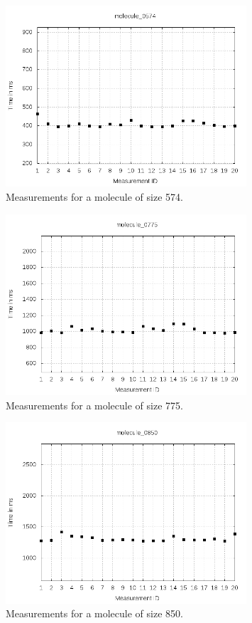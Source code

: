 \documentclass[a4paper,12pt]{article}
\begin{document}
\begin{figure}[!h]
  \centering
    \includegraphics[width=0.8\textwidth]{images/solver-perf-molecule_0574.png}
  \caption{Measurements for a molecule of size 574.}
\end{figure}

\begin{figure}[!h]
  \centering
    \includegraphics[width=0.8\textwidth]{images/solver-perf-molecule_0775.png}
  \caption{Measurements for a molecule of size 775.}
\end{figure}

\begin{figure}[!h]
  \centering
    \includegraphics[width=0.8\textwidth]{images/solver-perf-molecule_0850.png}
  \caption{Measurements for a molecule of size 850.}
\end{figure}
\end{document}
